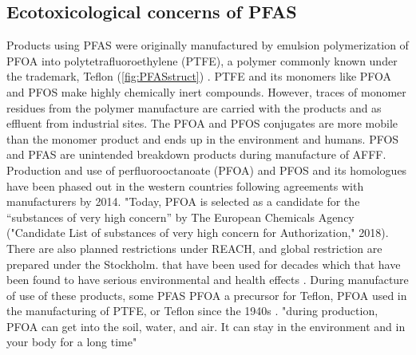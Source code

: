 \subsection{Ecotoxicological concerns of PFAS}
Products using PFAS were originally manufactured by emulsion polymerization of PFOA into polytetrafluoroethylene (PTFE), a polymer commonly known under the trademark, Teflon\textsuperscript{\texttrademark} (\cref{fig:PFASstruct}) \citep{Lehmler2005}. PTFE and its monomers like PFOA and PFOS make highly chemically inert compounds. However, traces of monomer residues from the polymer manufacture are carried with the products and as effluent from industrial sites. The PFOA and PFOS conjugates are more mobile than the monomer product and ends up in the environment and humans. PFOS and PFAS are unintended breakdown products during manufacture of AFFF. Production and use of perfluorooctanoate (PFOA) and PFOS and its homologues have been phased out in the western countries following agreements with manufacturers by 2014. "Today, PFOA is selected as a candidate for the “substances of very high concern” by The European Chemicals Agency ("Candidate List of substances of very high concern for Authorization," 2018). There are also planned restrictions under REACH, and global restriction are prepared under the Stockholm.
that have been used for decades which that have been found to have serious environmental and health effects \citep{Lau2007}. During manufacture of use of these products, some PFAS
PFOA a precursor for Teflon, PFOA used in the manufacturing of PTFE, or Teflon since the 1940s \citep{lindstrom2011}. "during production, PFOA can get into the soil, water, and air. It can stay in the environment and in your body for a long time"

